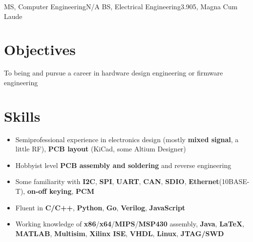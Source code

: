 \documentclass{my_resume}
\begin{document}

    {MS, Computer Engineering}{N/A}
	{BS, Electrical Engineering}{3.905, Magna Cum Laude}

\section{Objectives}
To being and pursue a career in hardware design engineering or firmware engineering

\section{Skills}
\begin{itemize}[noitemsep]
    \item Semiprofessional experience in electronics design (mostly \textbf{mixed signal}, a little RF), \textbf{PCB layout} (KiCad, some Altium Designer)
    \item Hobbyist level \textbf{PCB assembly and soldering} and reverse engineering
    \item Some familiarity with \textbf{I2C}, \textbf{SPI}, \textbf{UART}, \textbf{CAN}, \textbf{SDIO}, \textbf{Ethernet}(10BASE-T), \textbf{on-off keying}, \textbf{PCM}
    \item Fluent in \textbf{C/C++}, \textbf{Python}, \textbf{Go}, \textbf{Verilog}, \textbf{JavaScript}
    \item Working knowledge of \textbf{x86}/\textbf{x64}/\textbf{MIPS}/\textbf{MSP430} assembly, \textbf{Java}, \textbf{LaTeX}, \textbf{MATLAB}, \textbf{Multisim}, \textbf{Xilinx ISE}, \textbf{VHDL}, \textbf{Linux}, \textbf{JTAG/SWD}
\end{itemize}
\end{document}
